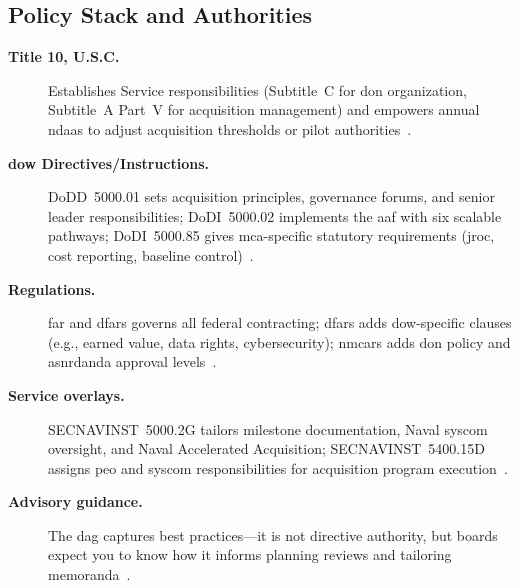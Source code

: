 \documentclass[../main.tex]{subfiles}
\begin{document}
\subsection{Policy Stack and Authorities}
\begin{description}
	\item[\textbf{Title 10, U.S.C.}] Establishes Service responsibilities (Subtitle~C for \ac{don} organization, Subtitle~A Part~V for acquisition management) and empowers annual \acp{ndaa} to adjust acquisition thresholds or pilot authorities~\autocite{edo-3-3-1-acq-policy-players-2025}.
	\item[\textbf{\ac{dow} Directives/Instructions.}] DoDD~5000.01 sets acquisition principles, governance forums, and senior leader responsibilities; DoDI~5000.02 implements the \ac{aaf} with six scalable pathways; DoDI~5000.85 gives \ac{mca}-specific statutory requirements (\ac{jroc}, cost reporting, baseline control)~\autocite{DoDD5000-01,DoDI5000-02,DoDI5000-85}.
	\item[\textbf{Regulations.}] \ac{far} and \ac{dfars} governs all federal contracting; \ac{dfars} adds \ac{dow}-specific clauses (e.g., earned value, data rights, cybersecurity); \ac{nmcars} adds \ac{don} policy and \ac{asnrdanda} approval levels~\autocite{FAR,DFARS,NMCARS}.
	\item[\textbf{Service overlays.}] SECNAVINST~5000.2G tailors milestone documentation, Naval \ac{syscom} oversight, and Naval Accelerated Acquisition; SECNAVINST~5400.15D assigns \ac{peo} and \ac{syscom} responsibilities for acquisition program execution~\autocite{SECNAV5000-2G,SECNAV5400-15D}.
	\item[\textbf{Advisory guidance.}] The \ac{dag} captures best practices---it is not directive authority, but boards expect you to know how it informs planning reviews and tailoring memoranda~\autocite{DoDAcqGuidebook}.
\end{description}
\end{document}
